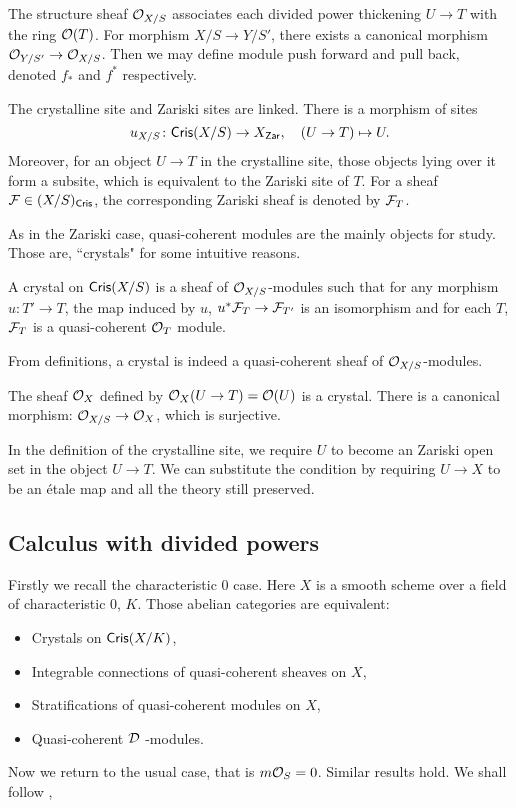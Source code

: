 The structure sheaf ${\mathcal {O}}_{X/S}$ associates 
each divided power thickening $U \to T$ with the ring ${\mathcal {O}}(T)$. 
For morphism $X/S \to Y/S'$, 
there exists a canonical morphism ${\mathcal {O}}_{Y/S'} \to {\mathcal {O}}_{X/S}$. 
Then we may define module push forward and pull back, 
denoted $f_*$ and $f^*$ respectively. 

The crystalline site and Zariski sites are linked. 
There is a morphism of sites 
\[
    u_{X/S} \colon \mathsf{Cris}(X/S) \to X_{\mathsf{Zar}}, \quad (U \to T) \mapsto U.
\]
Moreover, for an object $U \to T$ in the crystalline site, 
those objects lying over it form a subsite, 
which is equivalent to the Zariski site of $T$. 
For a sheaf ${\mathcal {F}} \in (X/S)_{\mathsf{Cris}}$, 
the corresponding Zariski sheaf is denoted by ${\mathcal {F}}_T$.

As in the Zariski case, 
quasi-coherent modules are the mainly objects for study. 
Those are, ``crystals" for some intuitive reasons.
\begin{definition}
    A crystal on $\mathsf{Cris}(X/S)$ is a sheaf of ${\mathcal {O}}_{X/S}$-modules 
    such that for any morphism $u\colon T' \to T$, 
    the map induced by $u$, $u^*{\mathcal {F}}_T \to {\mathcal {F}}_{T'}$ is an isomorphism 
    and for each $T$, ${\mathcal {F}}_T$ is a quasi-coherent ${\mathcal {O}}_T$ module. 
\end{definition}

From definitions, 
a crystal is indeed a quasi-coherent sheaf of ${\mathcal {O}}_{X/S}$-modules.
\begin{example}
    The sheaf ${\mathcal {O}}_X$ defined by ${\mathcal {O}}_X(U \to T) = {\mathcal {O}}(U)$ is a crystal. 
    There is a canonical morphism: ${\mathcal {O}}_{X/S} \to {\mathcal {O}}_X$, which is surjective.
\end{example}

\begin{remark}
    In the definition of the crystalline site, 
    we require $U$ to become an Zariski open set in the object $U \to T$. 
    We can substitute the condition by requiring 
    $U \to X$ to be an \'etale map and all the theory still preserved. 
\end{remark}

\subsection{Calculus with divided powers}
Firstly we recall the characteristic $0$ case. 
Here $X$ is a smooth scheme over a field of characteristic $0$, $K$. 
Those abelian categories are equivalent:
\begin{itemize}
    \item 
        Crystals on $\mathsf{Cris}(X/K)$,
    \item 
        Integrable connections of quasi-coherent sheaves on $X$,
    \item 
        Stratifications of quasi-coherent modules on $X$,
    \item 
        Quasi-coherent ${\mathcal {D}}$ -modules.
\end{itemize}
Now we return to the usual case, that is $m {\mathcal {O}}_S = 0$. 
Similar results hold. We shall follow \cite{Sta},

